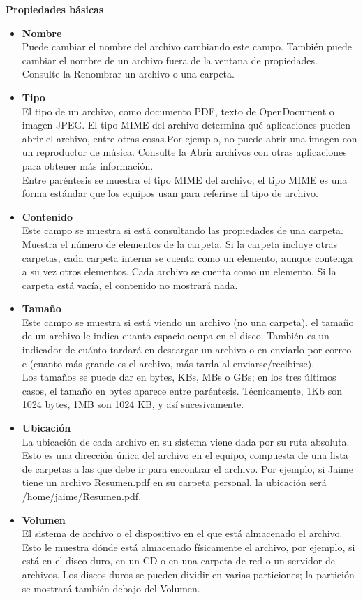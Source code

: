 {\bf Propiedades básicas}
\begin{itemize}
\item {\bf Nombre}\\
Puede cambiar el nombre del archivo cambiando este campo. También puede cambiar el nombre de un archivo fuera de la ventana de propiedades. Consulte la Renombrar un archivo o una carpeta.
\item {\bf Tipo}\\
El tipo de un archivo, como documento PDF, texto de OpenDocument o imagen JPEG. El tipo MIME del archivo determina qué aplicaciones pueden abrir el archivo, entre otras cosas.Por ejemplo, no puede abrir una imagen con un reproductor de música. Consulte la Abrir archivos con otras aplicaciones para obtener más información.\\
Entre paréntesis se muestra el tipo MIME del archivo; el tipo MIME es una forma estándar que los equipos usan para referirse al tipo de archivo.
\item {\bf Contenido}\\
Este campo se muestra si está consultando las propiedades de una carpeta. Muestra el número de elementos de la carpeta. Si la carpeta incluye otras carpetas, cada carpeta interna se cuenta como un elemento, aunque contenga a su vez otros elementos. Cada archivo se cuenta como un elemento. Si la carpeta está vacía, el contenido no mostrará nada.
\item {\bf Tamaño}\\
Este campo se muestra si está viendo un archivo (no una carpeta). el tamaño de un archivo le indica cuanto espacio ocupa en el disco. También es un indicador de cuánto tardará en descargar un archivo o en enviarlo por correo-e (cuanto más grande es el archivo, más tarda al enviarse/recibirse).\\
Los tamaños se puede dar en bytes, KBs, MBs o GBs; en los tres últimos casos, el tamaño en bytes aparece entre paréntesis. Técnicamente, 1Kb son 1024 bytes, 1MB son 1024 KB, y así sucesivamente.
\item {\bf Ubicación}\\
La ubicación de cada archivo en su sistema viene dada por su ruta absoluta. Esto es una dirección única del archivo en el equipo, compuesta de una lista de carpetas a las que debe ir para encontrar el archivo. Por ejemplo, si Jaime tiene un archivo Resumen.pdf en su carpeta personal, la ubicación será /home/jaime/Resumen.pdf.
\item {\bf Volumen}\\
El sistema de archivo o el dispositivo en el que está almacenado el archivo. Esto le muestra dónde está almacenado físicamente el archivo, por ejemplo, si está en el disco duro, en un CD o en una carpeta de red o un servidor de archivos. Los discos duros se pueden dividir en varias particiones; la partición se mostrará también debajo del Volumen.

\end{itemize}
